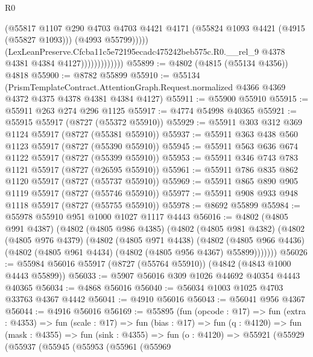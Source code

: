 \begin{lexlean}{R0}
\begin{coremodule}
                                  (@55817
                                    @1107
                                    @290
                                    @4703
                                    @4703
                                    @4421
                                    @4171
                                    (@55824 @1093 @4421 (@4915 (@55827 @1093)))
                                    (@4993 @55799)))))
                            (LexLeanPreserve.Cfcba11c5e72195ecadc475242beb575c.R0.__rel_9
                              @4378
                              @4381
                              @4384
                              @4127)))))))))))))
@55899 := @4802 (@4815 (@55134 @4356)) @4818
@55900 := @8782 @55899
@55910 := @55134
    (PrismTemplateContract.AttentionGraph.Request.normalized
      @4366
      @4369
      @4372
      @4375
      @4378
      @4381
      @4384
      @4127)
@55911 := @55900 @55910
@55915 := @55911 @263 @274 @296 @1125
@55917 := @4774 @54998 @40365
@55921 := @55915 @55917 (@8727 (@55372 @55910))
@55929 := @55911 @303 @312 @369 @1124 @55917 (@8727 (@55381 @55910))
@55937 := @55911 @363 @438 @560 @1123 @55917 (@8727 (@55390 @55910))
@55945 := @55911 @563 @636 @674 @1122 @55917 (@8727 (@55399 @55910))
@55953 := @55911 @346 @743 @783 @1121 @55917 (@8727 (@26595 @55910))
@55961 := @55911 @786 @835 @862 @1120 @55917 (@8727 (@55737 @55910))
@55969 := @55911 @865 @890 @905 @1119 @55917 (@8727 (@55746 @55910))
@55977 := @55911 @908 @933 @948 @1118 @55917 (@8727 (@55755 @55910))
@55978 := @8692 @55899
@55984 := @55978 @55910 @951 @1000 @1027 @1117 @4443
@56016 := @4802
    (@4805 @991 @4387)
    (@4802
      (@4805 @986 @4385)
      (@4802
        (@4805 @981 @4382)
        (@4802
          (@4805 @976 @4379)
          (@4802
            (@4805 @971 @4438)
            (@4802
              (@4805 @966 @4436)
              (@4802 (@4805 @961 @4434) (@4802 (@4805 @956 @4367) @55899)))))))
@56026 := @55984 @56016 @55917 (@8727 (@55764 @55910)) (@4842 (@4843 @1000 @4443 @55899))
@56033 := @5907 @56016 @309 @1026 @44692 @40354 @4443 @40365
@56034 := @4868 @56016
@56040 := @56034 @1003 @1025 @4703 @33763 @4367 @4442
@56041 := @4910 @56016
@56043 := @56041 @956 @4367
@56044 := @4916 @56016
@56169 := @55895
    (fun (opcode : @17) =>
    fun (extra : @4353) =>
    fun (scale : @17) =>
    fun (bias : @17) =>
    fun (q : @4120) =>
    fun (mask : @4355) =>
    fun (sink : @4355) =>
    fun (o : @4120) =>
    @55921
      (@55929
        (@55937
          (@55945
            (@55953
              (@55961
                (@55969

\end{coremodule}
\end{lexlean}
